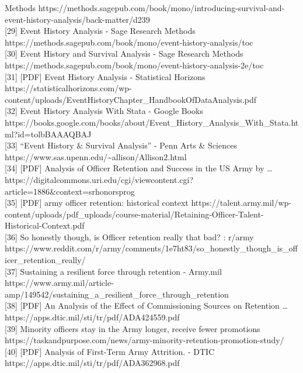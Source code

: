 \documentclass[
  letterpaper,
  DIV=11,
  numbers=noendperiod]{scrartcl}
\begin{document}
Methods
https://methods.sagepub.com/book/mono/introducing-survival-and-event-history-analysis/back-matter/d239\\
{[}29{]} Event History Analysis - Sage Research Methods
https://methods.sagepub.com/book/mono/event-history-analysis/toc\\
{[}30{]} Event History and Survival Analysis - Sage Research Methods
https://methods.sagepub.com/book/mono/event-history-analysis-2e/toc\\
{[}31{]} {[}PDF{]} Event History Analysis - Statistical Horizons
https://statisticalhorizons.com/wp-content/uploads/EventHistoryChapter\_HandbookOfDataAnalysis.pdf\\
{[}32{]} Event History Analysis With Stata - Google Books
https://books.google.com/books/about/Event\_History\_Analysis\_With\_Stata.html?id=tolbBAAAQBAJ\\
{[}33{]} ``Event History \& Survival Analysis'' - Penn Arts \& Sciences
https://www.sas.upenn.edu/\textasciitilde allison/Allison2.html\\
{[}34{]} {[}PDF{]} Analysis of Officer Retention and Success in the US
Army by \ldots{}
https://digitalcommons.uri.edu/cgi/viewcontent.cgi?article=1886\&context=srhonorsprog\\
{[}35{]} {[}PDF{]} army officer retention: historical context
https://talent.army.mil/wp-content/uploads/pdf\_uploads/course-material/Retaining-Officer-Talent-Historical-Context.pdf\\
{[}36{]} So honestly though, is Officer retention really that bad? :
r/army
https://www.reddit.com/r/army/comments/1e7ht83/so\_honestly\_though\_is\_officer\_retention\_really/\\
{[}37{]} Sustaining a resilient force through retention - Army.mil
https://www.army.mil/article-amp/149542/sustaining\_a\_resilient\_force\_through\_retention\\
{[}38{]} {[}PDF{]} An Analysis of the Effect of Commissioning Sources on
Retention \ldots{} https://apps.dtic.mil/sti/tr/pdf/ADA424559.pdf\\
{[}39{]} Minority officers stay in the Army longer, receive fewer
promotions
https://taskandpurpose.com/news/army-minority-retention-promotion-study/\\
{[}40{]} {[}PDF{]} Analysis of First-Term Army Attrition. - DTIC
https://apps.dtic.mil/sti/tr/pdf/ADA362968.pdf\\
\end{document}
